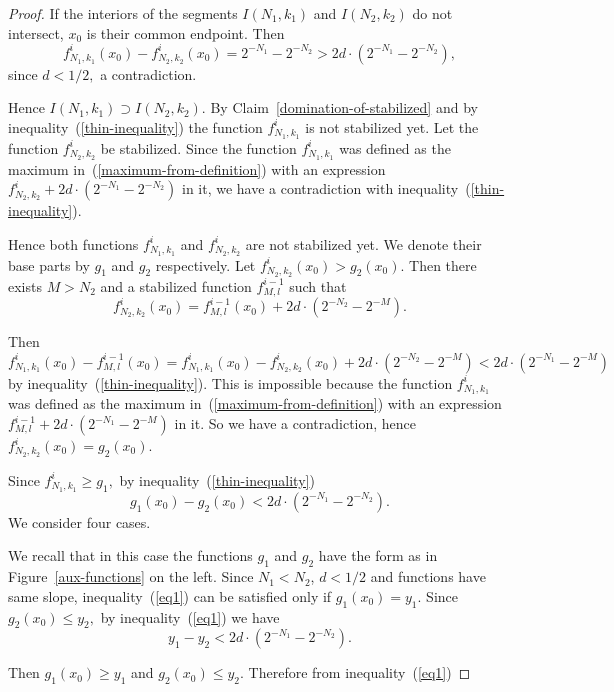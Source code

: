 \documentclass[12pt]{article}
\theoremstyle{definition}
\begin{document}
\begin{proof}
If the interiors of the segments $I(N_1,k_1)$ and $I(N_2,k_2)$ do not intersect, $x_0$ is their common endpoint. Then
$$
f_{N_1,k_1}^i(x_0) - f_{N_2, k_2}^i(x_0) = 2^{-N_1} - 2^{-N_2} > 2d\cdot\left(2^{-N_1} - 2^{-N_2}\right),
$$
since $d<1/2,$ a contradiction.

Hence $I(N_1,k_1)\supset I(N_2,k_2).$ By Claim~\ref{domination-of-stabilized} and by inequality~(\ref{thin-inequality}) the function $f_{N_1,k_1}^i$ is not stabilized yet. Let the function $f_{N_2,k_2}^i$ be stabilized. Since the function $f_{N_1,k_1}^i$ was defined as the maximum in~(\ref{maximum-from-definition}) with an expression $f_{N_2,k_2}^i + 2d\cdot\left(2^{-N_1} - 2^{-N_2}\right)$ in it, we have a contradiction with inequality~(\ref{thin-inequality}).

Hence both functions $f_{N_1,k_1}^i$ and $f_{N_2, k_2}^i$ are not stabilized yet. We denote their base parts by $g_1$ and $g_2$ respectively. Let $f_{N_2, k_2}^i (x_0) > g_2(x_0).$ Then there exists $M>N_2$ and a stabilized function $f_{M,l}^{i-1}$ such that
$$
 f_{N_2, k_2}^i (x_0) = f_{M,l}^{i-1}(x_0) + 2d\cdot\left( 2^{-N_2} - 2^{-M} \right).
$$

Then
$$
f_{N_1, k_1}^i(x_0) - f_{M,l}^{i-1}(x_0) = f_{N_1, k_1}^i(x_0) - f_{N_2, k_2}^i(x_0) + 2d\cdot\left( 2^{-N_2} - 2^{-M} \right) < 2d\cdot\left(2^{-N_1} - 2^{-M}\right)
$$
by inequality~(\ref{thin-inequality}). This is impossible because the function $f_{N_1,k_1}^i$ was defined as the maximum in~(\ref{maximum-from-definition}) with an expression $f_{M,l}^{i-1} + 2d\cdot\left(2^{-N_1} - 2^{-M}\right)$ in it. So we have a contradiction, hence $f_{N_2, k_2}^i (x_0) = g_2(x_0).$

Since $f_{N_1,k_1}^i\ge g_1,$ by inequality~(\ref{thin-inequality})
\begin{equation}
\label{eq1}
g_1(x_0) - g_2(x_0) < 2d\cdot\left(2^{-N_1}-2^{-N_2}\right).
\end{equation}
We consider four cases.

\smallskip
{}
We recall that in this case the functions $g_1$ and $g_2$ have the form as in Figure~\ref{aux-functions} on the left. Since $N_1 < N_2$, $d<1/2$ and functions have same slope, inequality~(\ref{eq1}) can be satisfied only if $g_1(x_0) = y_1.$ Since $g_2(x_0)\le y_2,$ by inequality~(\ref{eq1}) we have
$$
y_1 - y_2 < 2d\cdot\left(2^{-N_1} - 2^{-N_2}\right).
$$

\smallskip
{}
Then $g_1(x_0) \ge y_1$ and $g_2(x_0) \le y_2.$ Therefore from inequality~(\ref{eq1})


\end{proof}
\end{document}
